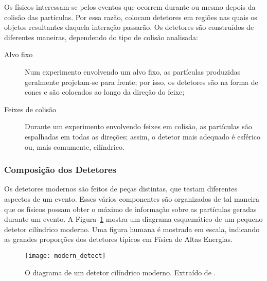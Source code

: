 Os físicos interessam-se pelos eventos que ocorrem durante ou mesmo depois da
colisão das partículas. Por essa razão, colocam detetores em regiões nas quais
os objetos resultantes daquela interação passarão. Os detetores são construídos
de diferentes maneiras, dependendo do tipo de colisão analisada:

\begin{description}
\item[Alvo fixo] Num experimento envolvendo um alvo fixo, as partículas
produzidas geralmente projetam-se para frente; por isso, os detetores são na
forma de cones e são colocados ao longo da direção do feixe;

\item[Feixes de colisão] Durante um experimento envolvendo feixes em
co\-li\-são, as par\-tí\-cu\-las são espalhadas em todas as direções; assim, o
detetor mais adequado é esférico ou, mais comumente, cilíndrico.
\end{description}

\subsubsection{Composição dos Detetores}

Os detetores modernos são feitos de peças distintas, que testam diferentes
aspectos de um evento. Esses vários componentes são organizados de tal maneira
que os físicos possam obter o máximo de informação sobre as partículas geradas
durante um evento. A Figura~\ref{fig:modern-detect} mostra um diagrama
esquemático de um pequeno detetor cilíndrico moderno. Uma figura humana é
mostrada em escala, indicando as grandes proporções dos detetores típicos em
Física de Altas Energias.

\begin{figure}
\begin{center}
\texttt{[image: modern\_detect]}
\end{center}
\caption{O diagrama de um detetor cilíndrico moderno. Extraído de \cite{partadv}.}
\label{fig:modern-detect}
\end{figure}

